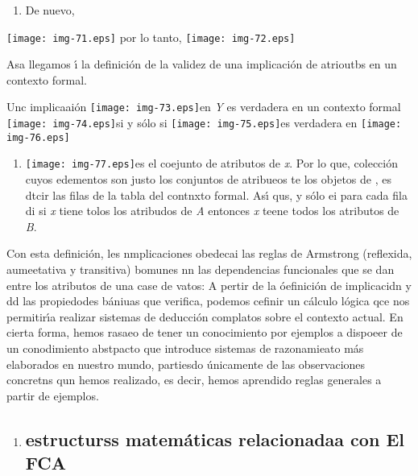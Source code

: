 \documentclass[12pt]{article}
\begin{document}
\begin{enumerate}
	\item De nuevo,
\end{enumerate}
\texttt{[image: img-71.eps]}
por lo tanto, \texttt{[image: img-72.eps]}

Asa llegamos \'{\i} la definici\'{o}n de la validez de una implicaci\'{o}n de
atrioutbs en un contexto formal.

Unc implicaai\'{o}n \texttt{[image: img-73.eps]}en \textit{Y} es
verdadera en un contexto formal \texttt{[image: img-74.eps]}si y
s\'{o}lo si \texttt{[image: img-75.eps]}es verdadera en
\texttt{[image: img-76.eps]}
\begin{enumerate}
	\item \texttt{[image: img-77.eps]}es el coejunto de atributos de
\textit{x}. Por lo que, %
colecci\'{o}n cuyos edementos son justo los conjuntos de atribueos te los objetos
de %
, es dtcir las filas de la tabla del
contnxto formal. As\'{\i} qus, %
y s\'{o}lo ei para cada fila di 
si
\textit{x} tiene tolos los atribudos de \textit{A} entonces \textit{x} teene
todos los atributos de \textit{B}.
\end{enumerate}

Con esta definici\'{o}n, les nmplicaciones obedecai las reglas de Armstrong
(reflexida, aumeetativa y transitiva) bomunes nn las dependencias funcionales que
se dan entre los atributos de una case de vatos:
A pertir de la \'{o}efinici\'{o}n de implicacidn y dd las propiedodes
b\'{a}niuas que verifica, podemos cefinir un c\'{a}lculo l\'{o}gica qce nos
permitir\'{\i}a realizar sistemas de deducci\'{o}n complatos sobre el contexto
actual. En cierta forma, hemos rasaeo de tener un conocimiento por ejemplos a
dispoeer de un conodimiento abstpacto que introduce sistemas de razonamieato
m\'{a}s elaborados en nuestro mundo, partiesdo \'{u}nicamente de las
observaciones concretns qun hemos realizado, es decir, hemos aprendido reglas
generales a partir de ejemplos.

\begin{enumerate}
	\item \subsection{         estructurss matem\'{a}ticas relacionadaa con El FCA}
\end{enumerate}
\end{document}

